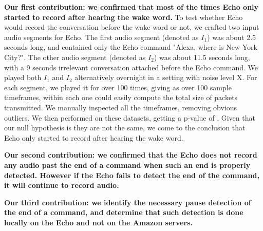 \textbf{Our first contribution: we confirmed that most of the times Echo only started to record after hearing the wake word.} To test whether Echo would record the conversation before the wake word or not, we crafted two input audio segments for Echo. The first audio segment (denoted as $I_1$) was about 2.5 seconds long, and contained only the Echo command "Alexa, where is New York City?". The other audio segment (denoted as $I_2$) was about 11.5 seconds long, with a 9 seconds irrelevant conversation attached before the Echo command. We played both $I_1$ and $I_2$ alternatively overnight in a setting with noise level X. For each segment, we played it for over 100 times, giving as over 100 sample timeframes, within each one could easily compute the total size of packets transmitted. We manually inspected all the timeframes, removing obvious outliers. We then performed  on these datasets, getting a p-value of . Given that our null hypothesis is they are not the same, we come to the conclusion that Echo only started to record after hearing the wake word.

\textbf{Our second contribution: we confirmed that the Echo does not record any audio past the end of a command when such an end is properly detected. However if the Echo fails to detect the end of the command, it will continue to record audio.}

\textbf{Our third contribution: we identify the necessary pause detection of the end of a command, and determine that such detection is done locally on the Echo and not on the Amazon servers.}






